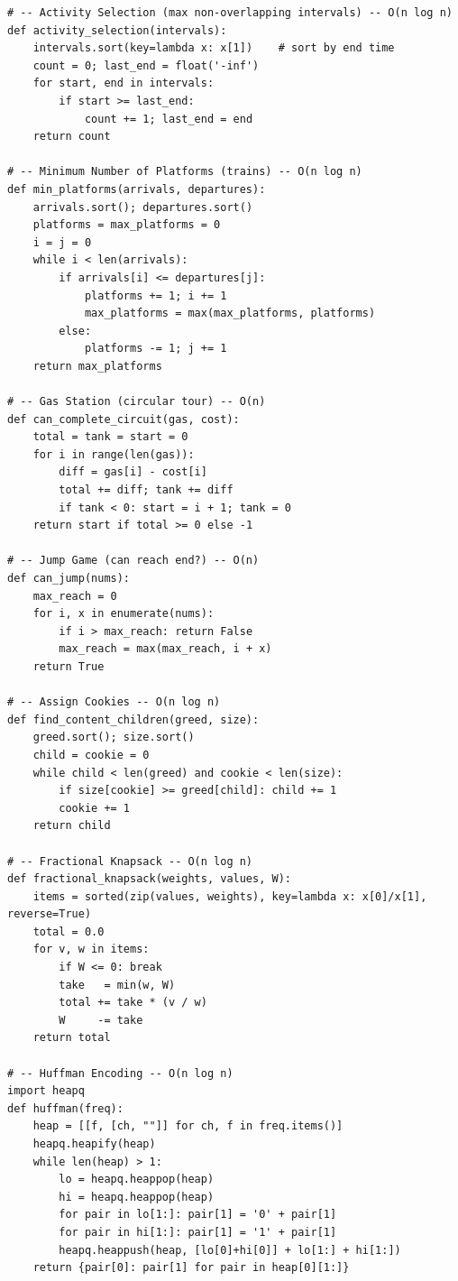 \documentclass[11pt,a4paper]{report}
\begin{document}
\begin{lstlisting}
# -- Activity Selection (max non-overlapping intervals) -- O(n log n)
def activity_selection(intervals):
    intervals.sort(key=lambda x: x[1])    # sort by end time
    count = 0; last_end = float('-inf')
    for start, end in intervals:
        if start >= last_end:
            count += 1; last_end = end
    return count

# -- Minimum Number of Platforms (trains) -- O(n log n)
def min_platforms(arrivals, departures):
    arrivals.sort(); departures.sort()
    platforms = max_platforms = 0
    i = j = 0
    while i < len(arrivals):
        if arrivals[i] <= departures[j]:
            platforms += 1; i += 1
            max_platforms = max(max_platforms, platforms)
        else:
            platforms -= 1; j += 1
    return max_platforms

# -- Gas Station (circular tour) -- O(n)
def can_complete_circuit(gas, cost):
    total = tank = start = 0
    for i in range(len(gas)):
        diff = gas[i] - cost[i]
        total += diff; tank += diff
        if tank < 0: start = i + 1; tank = 0
    return start if total >= 0 else -1

# -- Jump Game (can reach end?) -- O(n)
def can_jump(nums):
    max_reach = 0
    for i, x in enumerate(nums):
        if i > max_reach: return False
        max_reach = max(max_reach, i + x)
    return True

# -- Assign Cookies -- O(n log n)
def find_content_children(greed, size):
    greed.sort(); size.sort()
    child = cookie = 0
    while child < len(greed) and cookie < len(size):
        if size[cookie] >= greed[child]: child += 1
        cookie += 1
    return child

# -- Fractional Knapsack -- O(n log n)
def fractional_knapsack(weights, values, W):
    items = sorted(zip(values, weights), key=lambda x: x[0]/x[1], reverse=True)
    total = 0.0
    for v, w in items:
        if W <= 0: break
        take   = min(w, W)
        total += take * (v / w)
        W     -= take
    return total

# -- Huffman Encoding -- O(n log n)
import heapq
def huffman(freq):
    heap = [[f, [ch, ""]] for ch, f in freq.items()]
    heapq.heapify(heap)
    while len(heap) > 1:
        lo = heapq.heappop(heap)
        hi = heapq.heappop(heap)
        for pair in lo[1:]: pair[1] = '0' + pair[1]
        for pair in hi[1:]: pair[1] = '1' + pair[1]
        heapq.heappush(heap, [lo[0]+hi[0]] + lo[1:] + hi[1:])
    return {pair[0]: pair[1] for pair in heap[0][1:]}


\end{lstlisting}
\end{document}
